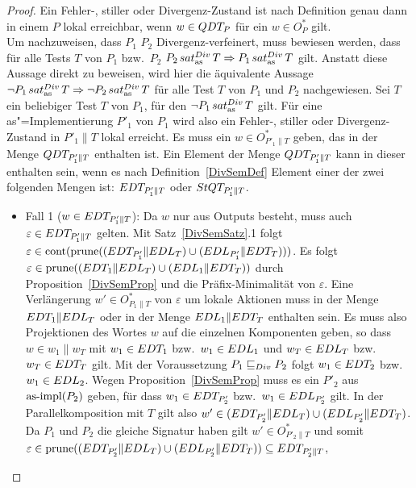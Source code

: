 \begin{proof}
  Ein Fehler-, stiller oder Divergenz-Zustand ist nach Definition genau dann in
  einem \MEIO{} $P$ lokal erreichbar, wenn $w\in QDT _P$ für ein $w\in O_P^*$
  gilt.\\
  Um nachzuweisen, dass $P_1$ $P_2$ Divergenz-verfeinert, muss bewiesen werden,
  dass für alle Tests $T$ von $P_1$ bzw.\ $P_2$ $P_2\hspace{0.05cm}sat_\mathrm{as}^{Div}\hspace{0.05cm} T \Rightarrow P_1
  \hspace{0.05cm}sat_\mathrm{as}^{Div}\hspace{0.05cm} T$ gilt. Anstatt diese Aussage direkt zu beweisen, wird hier die
  äquivalente Aussage $\neg P_1\hspace{0.05cm}sat_\mathrm{as}^{Div}\hspace{0.05cm} T\Rightarrow\neg P_2\hspace{0.05cm}sat_\mathrm{as}^{Div}\hspace{0.05cm} T$ für alle
  Test $T$ von $P_1$ und $P_2$ nachgewiesen. Sei $T$ ein beliebiger Test $T$ von
  $P_1$, für den $\neg P_1\hspace{0.05cm}sat_\mathrm{as}^{Div}\hspace{0.05cm} T$ gilt. Für eine as"=Implementierung $P'_1$
  von $P_1$ wird also ein Fehler-, stiller oder Divergenz-Zustand in $P'_1\|T$
  lokal erreicht. Es muss ein $w\in O_{P'_1\|T}^*$ geben, das in der Menge
  $QDT _{P'_1\|T}$ enthalten ist. Ein Element der Menge $QDT _{P'_1\|T}$ kann
  in dieser enthalten sein, wenn es nach Definition~\ref{DivSemDef} Element
  einer der zwei folgenden Mengen ist: $EDT _{P'_1\|T}$ oder $StQT _{P'_1\|T}$.
  \begin{itemize}
    \item Fall 1 ($w\in EDT _{P'_1\|T}$): Da $w$ nur aus Outputs besteht, muss
      auch $\varepsilon\in EDT _{P'_1\|T}$ gelten. Mit Satz~\ref{DivSemSatz}.1
      folgt $\varepsilon\in\mathrm{cont} (\mathrm{prune} ((EDT _{P'_1}\|EDL _T)\cup (EDL
      _{P'_1}\|EDT _T)))$. Es folgt $\varepsilon\in\mathrm{prune} ((EDT _1\|EDL
      _T)\cup (EDL _1\|EDT _T))$ durch Proposition~\ref{DivSemProp} und die
      Präfix-Minimalität von $\varepsilon$. Eine Verlängerung $w'\in
      O_{P_1\|T}^*$ von $\varepsilon$ um lokale Aktionen muss in der Menge
      $EDT _1\|EDL _T$ oder in der Menge $EDL _1\|EDT _T$ enthalten sein.
      Es muss also Projektionen des Wortes $w$ auf die einzelnen Komponenten
      geben, so dass $w\in w_1\|w_T$ mit $w_1\in EDT _1$ bzw.\ $w_1\in EDL _1$
      und $w_T\in EDL _T$ bzw.\ $w_T\in EDT _T$ gilt. Mit der Voraussetzung
      $P_1  \sqsubseteq  _{Div} P_2$ folgt $w_1\in EDT _2$ bzw.\ $w_1\in EDL _2$. Wegen
      Proposition~\ref{DivSemProp} muss es ein $P'_2$ aus $\mathrm{as}\text{-}\mathrm{impl} (P_2)$ geben,
      für dass $w_1\in EDT _{P'_2}$ bzw.\ $w_1\in EDL _{P'_2}$ gilt. In der
      Parallelkomposition mit $T$ gilt also $w'\in (EDT _{P'_2}\|EDL _T)\cup
      (EDL _{P'_2}\|EDT _T)$. Da $P_1$ und $P_2$ die gleiche Signatur haben
      gilt $w'\in O _{P'_2\|T}^*$ und somit $\varepsilon\in\mathrm{prune} ((EDT
      _{P'_2}\|EDL _T)\cup (EDL _{P'_2}\|EDT _T))\subseteq EDT _{P'_2\|T}$,

\end{itemize}
\end{proof}

